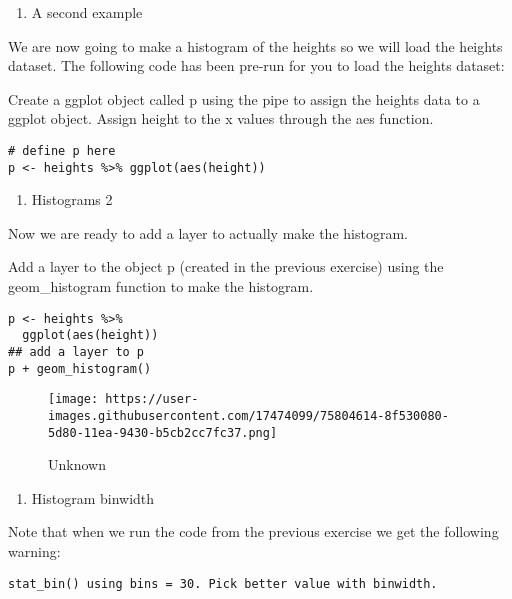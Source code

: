 \documentclass[]{article}
\providecommand{\tightlist}{%
  \setlength{\itemsep}{0pt}\setlength{\parskip}{0pt}}
\begin{document}
\begin{enumerate}
\def\labelenumi{\arabic{enumi}.}
\setcounter{enumi}{15}
\tightlist
\item
  A second example
\end{enumerate}

We are now going to make a histogram of the heights so we will load the
heights dataset. The following code has been pre-run for you to load the
heights dataset:

Create a ggplot object called p using the pipe to assign the heights
data to a ggplot object. Assign height to the x values through the aes
function.

\begin{verbatim}
# define p here
p <- heights %>% ggplot(aes(height))
\end{verbatim}

\begin{enumerate}
\def\labelenumi{\arabic{enumi}.}
\setcounter{enumi}{16}
\tightlist
\item
  Histograms 2
\end{enumerate}

Now we are ready to add a layer to actually make the histogram.

Add a layer to the object p (created in the previous exercise) using the
geom\_histogram function to make the histogram.

\begin{verbatim}
p <- heights %>% 
  ggplot(aes(height))
## add a layer to p
p + geom_histogram()
\end{verbatim}

\begin{figure}
\centering
\texttt{[image: https://user-images.githubusercontent.com/17474099/75804614-8f530080-5d80-11ea-9430-b5cb2cc7fc37.png]}
\caption{Unknown}
\end{figure}

\begin{enumerate}
\def\labelenumi{\arabic{enumi}.}
\setcounter{enumi}{17}
\tightlist
\item
  Histogram binwidth
\end{enumerate}

Note that when we run the code from the previous exercise we get the
following warning:

\begin{verbatim}
stat_bin() using bins = 30. Pick better value with binwidth.
\end{verbatim}
\end{document}
